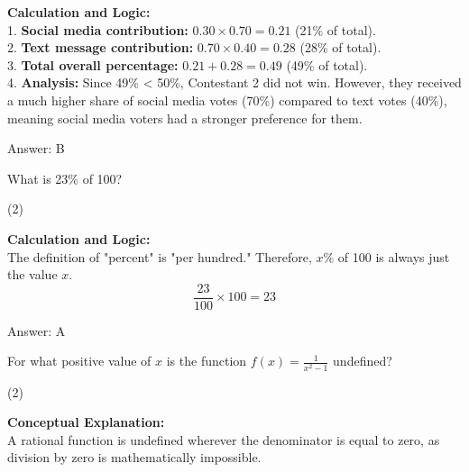 \documentclass[11pt,paper=a4,answers]{exam}
\begin{document}
\begin{questions}
\begin{solution}
\textbf{Calculation and Logic:} \\
1. \textbf{Social media contribution:} $0.30 \times 0.70 = 0.21$ (21\% of total). \\
2. \textbf{Text message contribution:} $0.70 \times 0.40 = 0.28$ (28\% of total). \\
3. \textbf{Total overall percentage:} $0.21 + 0.28 = 0.49$ (49\% of total). \\
4. \textbf{Analysis:} Since 49\% < 50\%, Contestant 2 did not win. However, they received a much higher share of social media votes (70\%) compared to text votes (40\%), meaning social media voters had a stronger preference for them.

\vspace{30pt}

Answer: \colorbox{yellow!100}{B}
\end{solution}

\vspace{60pt}

\question
What is 23\% of 100?
\begin{tasks}(2)
\end{tasks}

\begin{solution}
\textbf{Calculation and Logic:} \\
The definition of "percent" is "per hundred." Therefore, $x\%$ of 100 is always just the value $x$.
\[ \frac{23}{100} \times 100 = 23 \]

\vspace{30pt}

Answer: \colorbox{yellow!100}{A}
\end{solution}

\vspace{60pt}

\question
For what positive value of $x$ is the function $f(x) = \frac{1}{x^2 - 1}$ undefined?
\begin{tasks}(2)
\end{tasks}

\begin{solution}
\textbf{Conceptual Explanation:} \\
A rational function is undefined wherever the denominator is equal to zero, as division by zero is mathematically impossible.


\end{solution}
\end{questions}
\end{document}
